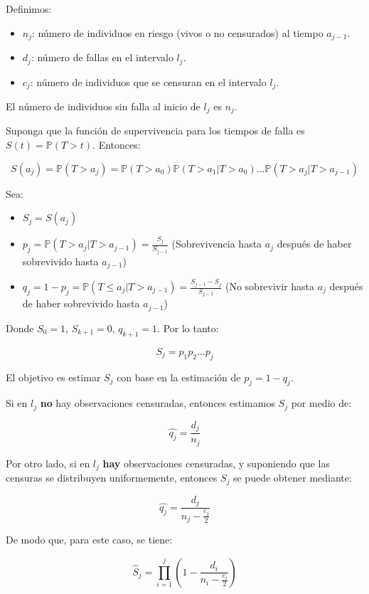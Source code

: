 \documentclass[
  a4paper,
  oneside,
  openany]{book}
\providecommand{\tightlist}{%
  \setlength{\itemsep}{0pt}\setlength{\parskip}{0pt}}
\begin{document}
Definimos:

\begin{itemize}
\tightlist
\item
  \(n_{j}\): número de individuos en riesgo (vivos o no censurados) al tiempo \(a_{j-1}\).
\item
  \(d_{j}\): número de fallas en el intervalo \(l_{j}\).
\item
  \(c_{j}\): número de individuos que se censuran en el intervalo \(l_{j}\).
\end{itemize}

El número de individuos sin falla al inicio de \(l_{j}\) es \(n_{j}\).

Suponga que la función de supervivencia para los tiempos de falla es \(S(t) = \mathbb{P}(T>t)\). Entonces:

\[
S(a_{j}) = \mathbb{P}(T>a_{j}) = \mathbb{P}(T>a_{0})\mathbb{P}(T>a_{1}|T>a_{0})...\mathbb{P}(T>a_{j}|T>a_{j-1})
\]

Sea:

\begin{itemize}
\tightlist
\item
  \(S_{j} = S(a_{j})\)
\item
  \(p_{j} = \mathbb{P}(T>a_{j}|T>a_{j-1}) =\frac{S_{j}}{S_{j-1}}\) (Sobrevivencia hasta \(a_{j}\) después de haber sobrevivido hasta \(a_{j-1}\))
\item
  \(q_{j} = 1-p_{j} = \mathbb{P}(T\leq a_{j}|T>a_{j-1}) = \frac{S_{j-1}-S_{j}}{S_{j-1}}\) (No sobrevivir hasta \(a_{j}\) después de haber sobrevivido hasta \(a_{j-1}\))
\end{itemize}

Donde \(S_{0} = 1\), \(S_{k+1} = 0\), \(q_{k+1} = 1\). Por lo tanto:

\[
S_{j} = p_{1}p_{2}...p_{j}
\]

El objetivo es estimar \(S_j\) con base en la estimación de \(p_j=1-q_j\).

Si en \(l_{j}\) \textbf{no} hay observaciones censuradas, entonces estimamos \(S_j\) por medio de:

\[
\hat{q_{j}} = \frac{d_{j}}{n_{j}}
\]

Por otro lado, si en \(l_{j}\) \textbf{hay} observaciones censuradas, y suponiendo que las censuras se distribuyen uniformemente, entonces \(S_j\) se puede obtener mediante:

\[
\hat{q_{j}} = \frac{d_{j}}{n_{j}-\frac{c_{j}}{2}}
\]

De modo que, para este caso, se tiene:

\[
\hat S_j=\prod_{i=1}^{j}\left(1-\frac{d_{i}}{n_{i}-\frac{c_{i}}{2}}\right)
\]
\end{document}
